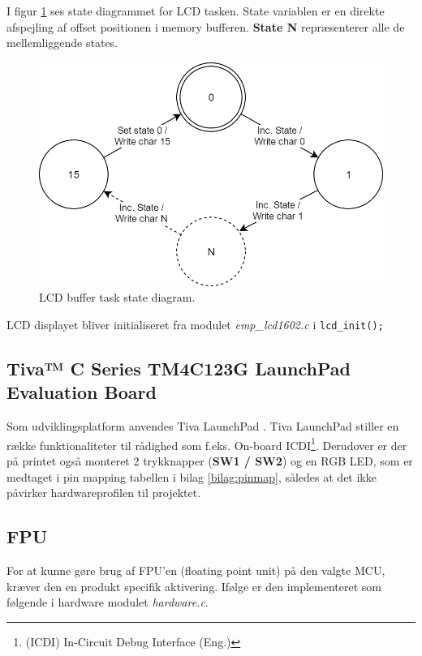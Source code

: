 I figur \ref{fig:lcd_task} ses state diagrammet for LCD tasken. State variablen er en direkte afspejling af offset positionen i memory bufferen. \textbf{State N} repræsenterer alle de mellemliggende states.

\begin{figure}[h!]
	\centering
	\includegraphics[width=.6\textwidth]{billeder/lcd_task.png}
	\caption{LCD buffer task state diagram.}
	\label{fig:lcd_task}
\end{figure}

LCD displayet bliver initialiseret fra modulet \textit{emp\_lcd1602.c} i  \texttt{lcd\_init();}
  
\FloatBlock

\subsection{Tiva™ C Series TM4C123G LaunchPad Evaluation Board}
Som udviklingsplatform anvendes Tiva LaunchPad \cite{spmu296}. 
Tiva LaunchPad stiller en række funktionaliteter til rådighed som f.eks. On-board ICDI\footnote{(ICDI) In-Circuit Debug Interface (Eng.)}.
Derudover er der på printet også monteret 2 trykknapper (\textbf{SW1 / SW2}) og en RGB LED, som er medtaget i pin mapping tabellen i bilag \ref{bilag:pinmap}, således at det ikke påvirker hardwareprofilen til projektet.   

\subsection{FPU}
For at kunne gøre brug af FPU'en (floating point unit) på den valgte MCU, kræver den en produkt specifik aktivering.
Ifølge \cite[afsnit 3.1.5.7 s. 132]{tm4c123gh6pm} er den implementeret som følgende i hardware modulet \textit{hardware.c}.

